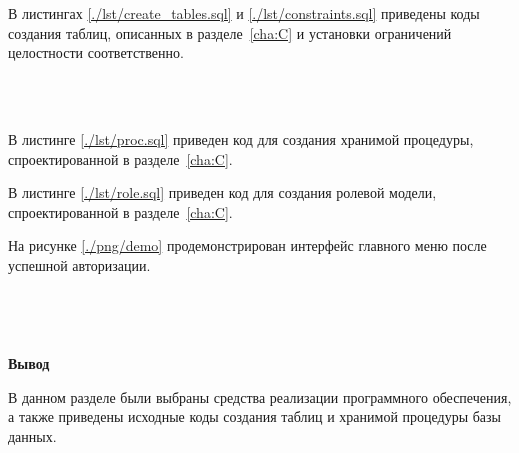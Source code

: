 В листингах \ref{./lst/create_tables.sql} и \ref{./lst/constraints.sql} приведены коды создания таблиц, описанных в разделе~\ref{cha:C} и установки ограничений целостности соответственно.

~\\
~


В листинге \ref{./lst/proc.sql} приведен код для создания хранимой процедуры, спроектированной в разделе~\ref{cha:C}.

В листинге \ref{./lst/role.sql} приведен код для создания ролевой модели, спроектированной в разделе~\ref{cha:C}.

На рисунке \ref{./png/demo} продемонстрирован интерфейс главного меню после успешной авторизации.
\\
~\\
~\\
~\\
~\\

\textbf{Вывод}

В данном разделе были выбраны средства реализации программного обеспечения, а также приведены исходные коды создания таблиц и хранимой процедуры базы данных.

